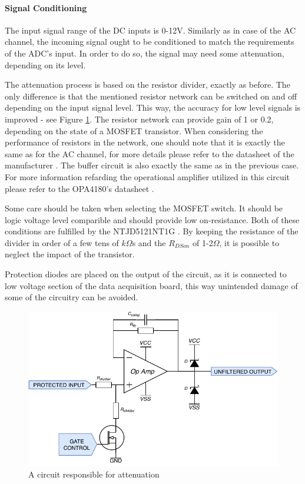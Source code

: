 \documentclass[12pt,a4paper]{article}
\begin{document}
\paragraph{Signal Conditioning}
The input signal range of the DC inputs is 0-12V. Similarly as in case of the AC channel, the incoming signal ought to be conditioned to match the requirements of the ADC's input. In order to do so, the signal may need some attenuation, depending on its level.
\par
The attenuation process is based on the resistor divider, exactly as before. The only difference is that the mentioned resistor network can be switched on and off depending on the input signal level. This way, the accuracy for low level signals is improved - see Figure \ref{fig:input3}. The resistor network can provide gain of 1 or 0.2, depending on the state of a MOSFET transistor. When considering the performance of resistors in the network, one should note that it is exactly the same as for the AC channel, for more details please refer to the datasheet of the manufacturer \cite{resistors}. The buffer circuit is also exactly the same as in the previous case. For more information refarding the operational amplifier utilized in this circuit please refer to the OPA4180's datasheet \cite{opa4180_params}.\par
Some care should be taken when selecting the MOSFET switch. It should be logic voltage level comparible and should provide low on-resistance. Both of these conditions are fulfilled by the NTJD5121NT1G \cite{mosfet_params}. By keeping the resistance of the divider in order of a few tens of $k\Omega$s and the $R_{DSon}$ of 1-2$\Omega$, it is possible to neglect the impact of the transistor.\par
Protection diodes are placed on the output of the circuit, as it is connected to low voltage section of the data acquisition board, this way unintended damage of some of the circuitry can be avoided.
\begin{figure}[ht!]
\includegraphics[scale=1.2]{input3.pdf}
\caption{A circuit responsible for attenuation}
\label{fig:input3}
\end{figure}
\par
\end{document}
